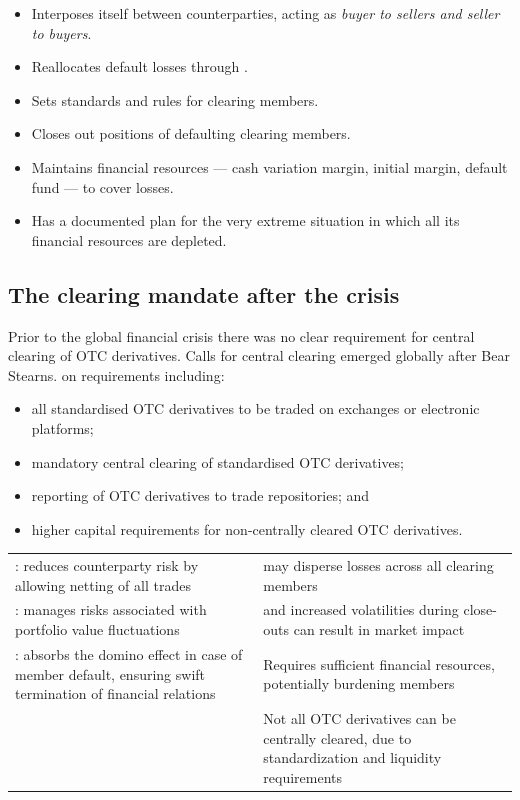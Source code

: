 \begin{itemize}
\item Interposes itself between counterparties, acting as \emph{buyer to sellers
and seller to buyers}.
\item Reallocates default losses through .
\item Sets standards and rules for clearing members.
\item Closes out positions of defaulting clearing members.
\item Maintains financial resources --- cash variation margin, initial margin,
default fund --- to cover losses.
\item Has a documented plan for the very extreme situation in which all its
financial resources are depleted.
\end{itemize}

\subsection*{The clearing mandate after the crisis}

Prior to the global financial crisis there was no clear requirement for central
clearing of OTC derivatives. Calls for central clearing emerged globally after
Bear Stearns.  on requirements
including:

\begin{itemize}
\item all standardised OTC derivatives to be traded on exchanges or electronic
platforms;
\item mandatory central clearing of standardised OTC derivatives;
\item reporting of OTC derivatives to trade repositories; and
\item higher capital requirements for non-centrally cleared OTC derivatives.
\end{itemize}

\begin{center}
\footnotesize
\begin{tabular}{L{7.0cm} L{7.5cm}}
\toprule
{} &  \\
\midrule
{}: reduces counterparty risk by allowing netting of all trades &
   may disperse losses across all clearing members \\
: manages risks associated with portfolio value
  fluctuations &
   and increased volatilities during close-outs can
  result in market impact \\
: absorbs the domino effect in case of member
  default, ensuring swift termination of financial relations &
  Requires sufficient financial resources, potentially burdening members \\
 & Not all OTC derivatives can be centrally cleared, due to standardization and
  liquidity requirements \\
\bottomrule
\end{tabular}
\end{center}

